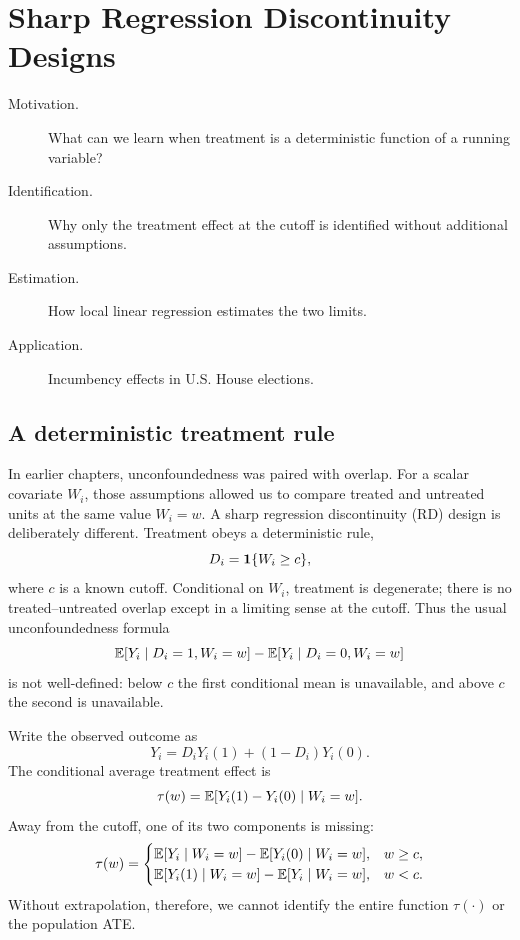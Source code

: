 \chapter{Sharp Regression Discontinuity Designs}
\label{chap:rd}

\begin{description}
  \item[Motivation.] What can we learn when treatment is a deterministic
  function of a running variable?
  \item[Identification.] Why only the treatment effect at the cutoff is
  identified without additional assumptions.
  \item[Estimation.] How local linear regression estimates the two limits.
  \item[Application.] Incumbency effects in U.S. House elections.
\end{description}

\section{A deterministic treatment rule}

In earlier chapters, unconfoundedness was paired with overlap.  For a scalar
covariate $W_i$, those assumptions allowed us to compare treated and untreated
units at the same value $W_i=w$.  A sharp regression discontinuity (RD) design
is deliberately different.  Treatment obeys a deterministic rule,
\begin{equation}
  D_i=\mathbf{1}\{W_i\geq c\},
  \label{eq:rd-assignment}
\end{equation}
where $c$ is a known cutoff.  Conditional on $W_i$, treatment is degenerate;
there is no treated--untreated overlap except in a limiting sense at the
cutoff.  Thus the usual unconfoundedness formula
\[
  \mathbb{E}[Y_i\mid D_i=1,W_i=w]-\mathbb{E}[Y_i\mid D_i=0,W_i=w]
\]
is not well-defined: below $c$ the first conditional mean is unavailable, and
above $c$ the second is unavailable.

Write the observed outcome as
\[
  Y_i=D_iY_i(1)+(1-D_i)Y_i(0).
\]
The conditional average treatment effect is
\begin{equation}
  \tau(w)=\mathbb{E}[Y_i(1)-Y_i(0)\mid W_i=w].
  \label{eq:rd-cate}
\end{equation}
Away from the cutoff, one of its two components is missing:
\[
  \tau(w)=
  \begin{cases}
    \mathbb{E}[Y_i\mid W_i=w]-\mathbb{E}[Y_i(0)\mid W_i=w], & w\geq c,\\
    \mathbb{E}[Y_i(1)\mid W_i=w]-\mathbb{E}[Y_i\mid W_i=w], & w<c.
  \end{cases}
\]
Without extrapolation, therefore, we cannot identify the entire function
$\tau(\cdot)$ or the population ATE.

